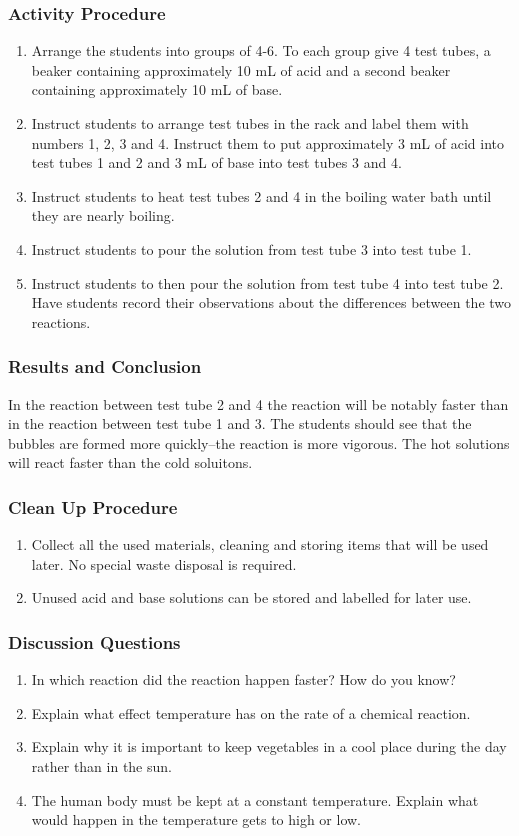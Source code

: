 \subsubsection*{Activity Procedure}
\begin{enumerate}
\item{Arrange the students into groups of 4-6. To each group give 4 test tubes, a beaker containing approximately 10 mL of acid and a second beaker containing approximately 10 mL of base.}
\item{Instruct students to arrange test tubes in the rack and label them with numbers 1, 2, 3 and 4. Instruct them to put approximately 3 mL of acid into test tubes 1 and 2 and 3 mL of base into test tubes 3 and 4.}
\item{Instruct students to heat test tubes 2 and 4 in the boiling water bath until they are nearly boiling.}
\item{Instruct students to pour the solution from test tube 3 into test tube 1.}
\item{Instruct students to then pour the solution from test tube 4 into test tube 2. Have students record their observations about the differences between the two reactions.}
\end{enumerate}

\subsubsection*{Results and Conclusion}
In the reaction between test tube 2 and 4 the reaction will be notably faster than in the reaction between test tube 1 and 3. The students should see that the bubbles are formed more quickly--the reaction is more vigorous. The hot solutions will react faster than the cold soluitons.

\subsubsection*{Clean Up Procedure}
\begin{enumerate}
\item{Collect all the used materials, cleaning and storing items that will be used later. No special waste disposal is required.}
\item{Unused acid and base solutions can be stored and labelled for later use.}
\end{enumerate}

\subsubsection*{Discussion Questions}
\begin{enumerate}
\item{In which reaction did the reaction happen faster? How do you know?}
\item{Explain what effect temperature has on the rate of a chemical reaction.}
\item{Explain why it is important to keep vegetables in a cool place during the day rather than in the sun.}
\item{The human body must be kept at a constant temperature. Explain what would happen in the temperature gets to high or low.}
\end{enumerate}

